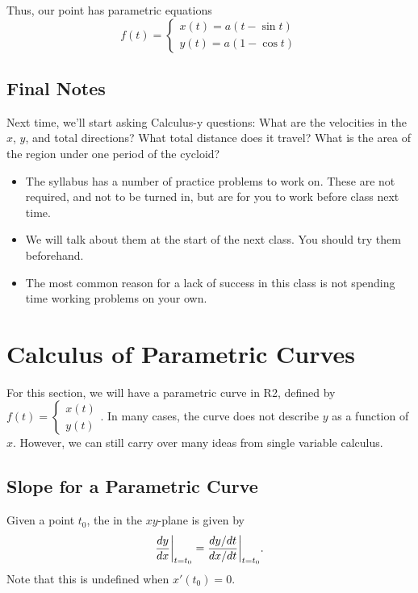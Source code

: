 Thus, our point has parametric equations
\[
    f(t) = \begin{cases}
        x(t) = a(t - \sin t) \\
        y(t) = a(1 - \cos t)
    \end{cases}
\]

\subsection{Final Notes}

Next time, we'll start asking Calculus-y questions: What are the velocities in the \(x\), \(y\), and total directions? What total distance does it travel? What is the area of the region under one period of the cycloid?
\begin{itemize}
    \item The syllabus has a number of practice problems to work on. These are not required, and not to be
          turned in, but are for you to work before class next time.
    \item We will talk about them at the start of the next class. You should try them beforehand.
    \item The most common reason for a lack of success in this class is not spending time working problems on
          your own.
\end{itemize}

\newpage

\section{Calculus of Parametric Curves}

For this section, we will have a parametric curve in R2, defined by \(f(t) = \begin{cases}
    x(t) \\
    y(t)
\end{cases}.\) 
In many cases, the curve does not describe \(y\) as a function of \(x\). However, we can still carry over many ideas from single variable calculus.

\subsection{Slope for a Parametric Curve}

Given a point \(t_{0}\), the  in the \(xy\)-plane is given by
\[
    \frac{dy}{dx}\bigg|_{t = t_{0}} = \frac{dy/dt}{dx/dt}\bigg|_{t = t_{0}}. \\
\]
Note that this is undefined when \(x'(t_{0}) = 0\). \\

